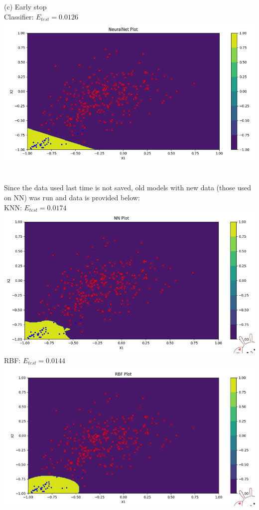 \documentclass[12pt]{article}
\begin{document}
(c) Early stop\\
Classifier: $E_{test}=0.0126$\\
\includegraphics[scale=0.6]{images/nn3}\\\\\\
Since the data used last time is not saved, old models with new data (those used on NN) was run and data is provided below:\\
KNN: $E_{test} = 0.0174$\\
\includegraphics[scale=0.6]{images/nearest}\\
RBF: $E_{test} = 0.0144$\\
\includegraphics[scale=0.6]{images/rbf}\\
\end{document}
